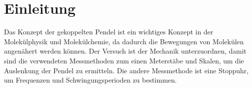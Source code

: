 \section{Einleitung}

Das Konzept der gekoppelten Pendel ist ein wichtiges Konzept in der Molekülphysik und Molekülchemie, da dadurch die Bewegungen von Molekülen angenähert werden können. Der Versuch ist der Mechanik unterzuordnen, damit sind die verwendeten Messmethoden zum einen Meterstäbe und Skalen, um die Auslenkung der Pendel zu ermitteln. Die andere Messmethode ist eine Stoppuhr, um Frequenzen und Schwingungsperioden zu bestimmen.
